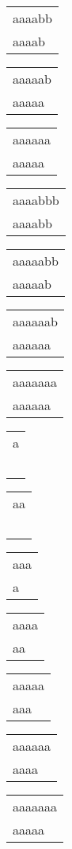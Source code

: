 \begin{tabular}{|l|} \hline
aaaabb \\
aaaab\  \\
\hline
\end{tabular} 
\begin{tabular}{|l|} \hline
aaaaab \\
aaaaa\  \\
\hline
\end{tabular} 
\begin{tabular}{|l|} \hline
aaaaaa \\
aaaaa\  \\
\hline
\end{tabular} 
\begin{tabular}{|l|} \hline
aaaabbb \\
aaaabb\  \\
\hline
\end{tabular} 
\begin{tabular}{|l|} \hline
aaaaabb \\
aaaaab\  \\
\hline
\end{tabular} 
\begin{tabular}{|l|} \hline
aaaaaab \\
aaaaaa\  \\
\hline
\end{tabular} 
\begin{tabular}{|l|} \hline
aaaaaaa \\
aaaaaa\  \\
\hline
\end{tabular} 
\begin{tabular}{|l|} \hline
a \\
\  \\
\hline
\end{tabular} 
\begin{tabular}{|l|} \hline
aa \\
\ \  \\
\hline
\end{tabular} 
\begin{tabular}{|l|} \hline
aaa \\
a\ \  \\
\hline
\end{tabular} 
\begin{tabular}{|l|} \hline
aaaa \\
aa\ \  \\
\hline
\end{tabular} 
\begin{tabular}{|l|} \hline
aaaaa \\
aaa\ \  \\
\hline
\end{tabular} 
\begin{tabular}{|l|} \hline
aaaaaa \\
aaaa\ \  \\
\hline
\end{tabular} 
\begin{tabular}{|l|} \hline
aaaaaaa \\
aaaaa\ \  \\
\hline
\end{tabular} 

